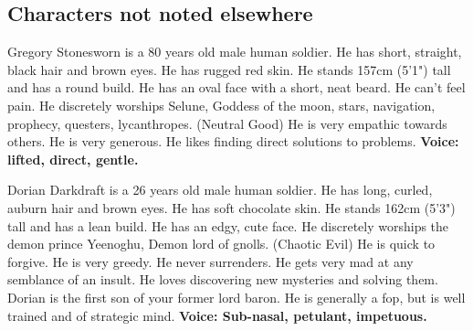 \subsection*{Characters not noted elsewhere}

Gregory Stonesworn is a 80 years old male human soldier.
He has short, straight, black hair and brown eyes.
He has rugged red skin.
He stands 157cm (5'1") tall and has a round build.
He has an oval face with a short, neat beard.
He can't feel pain.
He discretely worships Selune, Goddess of the moon, stars, navigation, prophecy, questers, lycanthropes. (Neutral Good)
He is very empathic towards others.
He is very generous.
He likes finding direct solutions to problems.
\textbf{Voice: lifted, direct, gentle.}

Dorian Darkdraft is a 26 years old male human soldier.
He has long, curled, auburn hair and brown eyes.
He has soft chocolate skin.
He stands 162cm (5'3") tall and has a lean build.
He has an edgy, cute face.
He discretely worships the demon prince Yeenoghu, Demon lord of gnolls. (Chaotic Evil)
He is quick to forgive.
He is very greedy.
He never surrenders.
He gets very mad at any semblance of an insult.
He loves discovering new mysteries and solving them.
Dorian is the first son of your former lord baron.
He is generally a fop, but is well trained and of strategic mind.
\textbf{Voice: Sub-nasal, petulant, impetuous.}

\hrulefill
\clearpage

